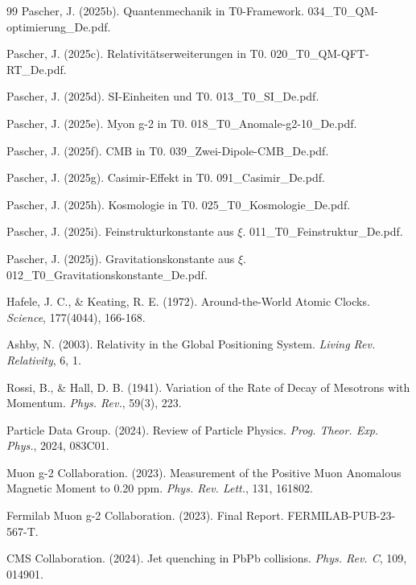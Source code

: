 \begin{thebibliography}{99}
		Pascher, J. (2025b). Quantenmechanik in T0-Framework. 034\_T0\_QM-optimierung\_De.pdf.
		
		Pascher, J. (2025c). Relativitätserweiterungen in T0. 020\_T0\_QM-QFT-RT\_De.pdf.
		
		Pascher, J. (2025d). SI-Einheiten und T0. 013\_T0\_SI\_De.pdf.
		
		Pascher, J. (2025e). Myon g-2 in T0. 018\_T0\_Anomale-g2-10\_De.pdf.
		
		Pascher, J. (2025f). CMB in T0. 039\_Zwei-Dipole-CMB\_De.pdf.
		
		Pascher, J. (2025g). Casimir-Effekt in T0. 091\_Casimir\_De.pdf.
		
		Pascher, J. (2025h). Kosmologie in T0. 025\_T0\_Kosmologie\_De.pdf.
		
		Pascher, J. (2025i). Feinstrukturkonstante aus $\xi$. 011\_T0\_Feinstruktur\_De.pdf.
		
		Pascher, J. (2025j). Gravitationskonstante aus $\xi$. 012\_T0\_Gravitationskonstante\_De.pdf.
		
		Hafele, J. C., \& Keating, R. E. (1972). Around-the-World Atomic Clocks. \emph{Science}, 177(4044), 166-168.
		
		Ashby, N. (2003). Relativity in the Global Positioning System. \emph{Living Rev. Relativity}, 6, 1.
		
		Rossi, B., \& Hall, D. B. (1941). Variation of the Rate of Decay of Mesotrons with Momentum. \emph{Phys. Rev.}, 59(3), 223.
		
		Particle Data Group. (2024). Review of Particle Physics. \emph{Prog. Theor. Exp. Phys.}, 2024, 083C01.
		
		Muon g-2 Collaboration. (2023). Measurement of the Positive Muon Anomalous Magnetic Moment to 0.20 ppm. \emph{Phys. Rev. Lett.}, 131, 161802.
		
		Fermilab Muon g-2 Collaboration. (2023). Final Report. FERMILAB-PUB-23-567-T.
		
		CMS Collaboration. (2024). Jet quenching in PbPb collisions. \emph{Phys. Rev. C}, 109, 014901.
		

\end{thebibliography}
